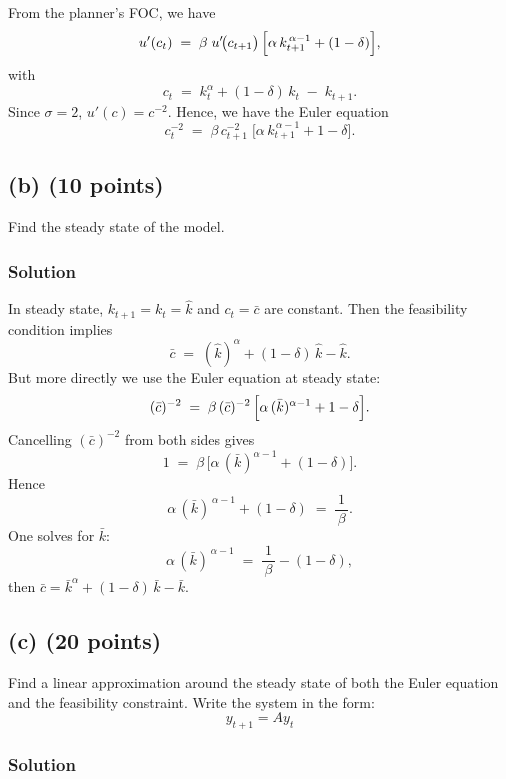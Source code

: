 \documentclass[12pt]{article}
\begin{document}

From the planner's FOC, we have
\[
u'(c_t)
\;=\;
\beta\;u'\!\bigl(c_{t+1}\bigr)\,
\Bigl[\alpha\,k_{t+1}^{\,\alpha-1} + (1-\delta)\Bigr],
\]
with
\[
c_t \;=\; k_t^\alpha + (1-\delta)\,k_t \;-\; k_{t+1}.
\]
Since $\sigma=2$, $u'(c)=c^{-2}$.  Hence, we have the Euler equation
\[
c_t^{-2}
\;=\;
\beta\,c_{t+1}^{-2}\;\bigl[\alpha\,k_{t+1}^{\,\alpha-1} + 1-\delta\bigr].
\]


\subsection*{(b) (10 points)}
Find the steady state of the model.

\subsubsection*{Solution}
In steady state, $k_{t+1}=k_t=\hat{k}$ and $c_t=\bar{c}$ are constant.  Then the feasibility condition implies
\[
\bar{c} \;=\; (\hat{k})^\alpha + (1-\delta)\,\hat{k} - \hat{k}.
\]
But more directly we use the Euler equation at steady state:
\[
(\bar{c})^{-2}
\;=\;
\beta\,(\bar{c})^{-2}\,\Bigl[\alpha\,(\bar{k})^{\alpha-1} + 1-\delta\Bigr].
\]
Cancelling $(\bar{c})^{-2}$ from both sides gives
\[
1
\;=\;
\beta\,\bigl[\alpha\,(\bar{k})^{\alpha-1} + (1-\delta)\bigr].
\]
Hence
\[
\alpha\,(\bar{k})^{\,\alpha-1} + (1-\delta)
\;=\;
\frac{1}{\,\beta\,}.
\]
One solves for $\bar{k}$:
\[
\alpha\,(\bar{k})^{\,\alpha-1}
\;=\;
\frac{1}{\,\beta\,} - (1-\delta),
\]
then $\bar{c}=\bar{k}^{\alpha}+(1-\delta)\,\bar{k}-\bar{k}$.  


\subsection*{(c) (20 points)}
Find a linear approximation around the steady state of both the Euler equation and the feasibility constraint. Write the system in the form:
\[
y_{t+1} = Ay_t
\]
\subsubsection*{Solution}
\end{document}
